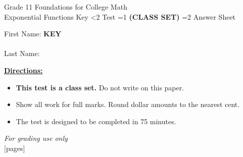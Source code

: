 \documentclass[addpoints]{exam}
\newcommand{\event}{Exponential Functions}
\newcommand{\tournament}{}
\def\type{0}
\begin{document}
\begin{center}
    {\huge Grade 11 Foundations for College Math \\ \event
    \ifprintanswers \space Key
    \else \space \ifnum\type<2 Test \fi \ifnum\type=1 \textbf{(CLASS SET)} \fi
          \ifnum\type=2 Answer Sheet \fi
    \fi \\ \vspace{3mm}\tournament\vspace{1mm}}
\end{center}

\vspace{.25\textheight}

\begin{center}
    First Name: \ifprintanswers
    \underline{\hspace{3.5cm}}\textbf{KEY}\underline{\hspace{5.5cm}}\\\ \vspace{5mm}
    \else \underline{\hspace{10cm}}\\ \vspace{5mm} \fi
    Last Name: \underline{\hspace{10cm}}\\ \vspace{5mm}
\end{center}

\noindent\textbf{\underline{Directions:}}
\begin{itemize}
    \ifnum\type=1 \item \textbf{This test is a class set.} Do not write on this paper. \fi
    \item Show all work for full marks. Round dollar amounts to the nearest cent.
    \item The test is designed to be completed in 75 minutes.
\end{itemize}
\begin{center}
\textit{For grading use only}\\
[pages]
\end{center}
\end{document}
